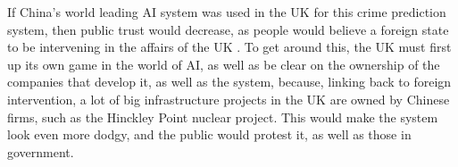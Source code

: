 If China's world leading AI system was used in the UK for this crime prediction system, then public trust would
decrease, as people would believe a foreign state to be intervening in the affairs of the UK .
To get around this, the UK must first up its own game in the world of AI, as well as be clear on the ownership of the
companies that develop it, as well as the system, because, linking back to foreign intervention, a lot of big
infrastructure projects in the UK are owned by Chinese firms, such as the Hinckley Point nuclear project\cite{hinkley}.
This would make the system look even more dodgy, and the public would protest it, as well as those in government.